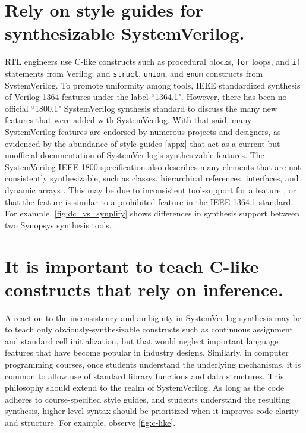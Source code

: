 \FloatBarrier

\section{Rely on style guides for synthesizable SystemVerilog.}



RTL engineers use C-like constructs such as procedural blocks, \texttt{for} loops, and \texttt{if} statements from Verilog; and \texttt{struct}, \texttt{union}, and \texttt{enum} constructs from SystemVerilog. To promote uniformity among tools, IEEE standardized synthesis of Verilog 1364 features under the label ``1364.1". However, there has been no official ``1800.1" SystemVerilog synthesis standard to discuss the many new features that were added with SystemVerilog. With that said, many SystemVerilog features are endorsed by numerous projects and designers, as evidenced by the abundance of style guides [appx] that act as a current but unofficial documentation of SystemVerilog's synthesizable features. The SystemVerilog IEEE 1800 specification also describes many elements that are not consistently synthesizable, such as classes, hierarchical references, interfaces, and dynamic arrays \cite{1800-2017, sutherland}. This may be due to inconsistent tool-support for a feature \cite{svtests}, or that the feature is similar to a prohibited feature in the IEEE 1364.1 standard. For example, \autoref{fig:dc_vs_synplify} shows differences in synthesis support between two Synopsys synthesis tools.

\FloatBarrier

\section{It is important to teach C-like constructs that rely on inference.}



A reaction to the inconsistency and ambiguity in SystemVerilog synthesis may be to teach only obviously-synthesizable constructs such as continuous assignment and standard cell initialization, but that would neglect important language features that have become popular in industry designs. Similarly, in computer programming courses, once students understand the underlying mechanisms, it is common to allow use of standard library functions and data structures. This philosophy should extend to the realm of SystemVerilog. As long as the code adheres to course-specified style guides, and students understand the resulting synthesis, higher-level syntax should be prioritized when it improves code clarity and structure. For example, observe \autoref{fig:c-like}.

